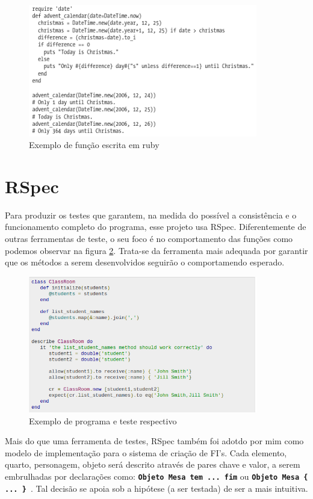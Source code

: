 \begin{figure}
  \includegraphics[width=10cm]{figuras/ruby}
  \caption{Exemplo de função escrita em ruby}
  \label{fig:ruby}
\end{figure}

\section{RSpec}
\label{sec:rspec}

Para produzir os testes que garantem, na medida do possível a consistência e o
funcionamento completo do programa, esse projeto usa RSpec. Diferentemente de
outras ferramentas de teste, o seu foco é no comportamento das funções como
podemos observar na figura \ref{fig:rspec}. Trata-se da ferramenta mais adequada
por garantir que os métodos a serem desenvolvidos seguirão o comportamendo
esperado.

\begin{figure}[htb]
\includegraphics[width=10cm]{figuras/rspec}
\caption{\label{fig:rspec} Exemplo de programa e teste respectivo}
\end{figure}

Mais do que uma ferramenta de testes, RSpec também foi adotdo por mim como
modelo de implementação para o sistema de criação de FI's. Cada elemento,
quarto, personagem, objeto será descrito através de pares chave e valor, a serem
embrulhadas por declarações como: \textbf{\texttt{Objeto Mesa tem ... fim}} ou
\textbf{\texttt{Objeto Mesa \{ ... \} }}. Tal decisão se apoia sob a hipótese (a
ser testada) de ser a mais intuitiva.

